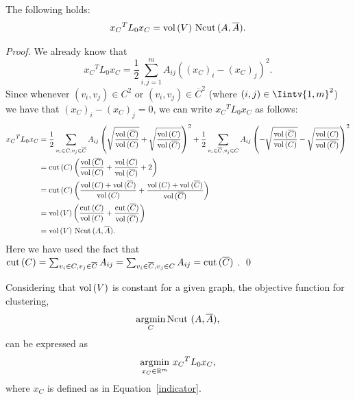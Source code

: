 \begin{theorem}\label{xtxcut}
   The following holds:
   \begin{equation}
      {x_C}^TL_0{x_C} = \operatorname*{vol\,}(V)\, \operatorname*{Ncut\,} (A, \overline A).
   \end{equation}
\end{theorem}
\begin{proof}
   We already know that
   \begin{equation*}
         {x_C}^TL_0{x_C} = \frac{1}{2} \sum_{i,j=1}^m A_{ij} ((x_C)_i - (x_C)_j) ^2 .
   \end{equation*}
   Since whenever $(v_i, v_j) \in C^2$ or $(v_i, v_j) \in {\overline C}^2$ (where $(i,j) \in \Iintv{1,m}^2$) we have that $(x_C)_i - (x_C)_j = 0$, we can write ${x_C}^TL_0{x_C}$ as follows:
   \begin{equation*}
      \begin{split}
         {x_C}^TL_0{x_C} &=  \frac{1}{2} \sum_{v_i \in C, v_j \in \overline C}A_{ij} \left( \sqrt{\frac{\operatorname*{vol\,} (\overline C)}{\operatorname*{vol\,} (C)}} + \sqrt{\frac{\operatorname*{vol\,} (C)}{\operatorname*{vol\,} (\overline C)}} \right)^2 + \frac{1}{2} \sum_{v_i \in \overline C, v_j \in C} A_{ij} \left( -\sqrt{\frac{\operatorname*{vol\,} (\overline C)}{\operatorname*{vol\,} (C)}}  -\sqrt{\frac{\operatorname*{vol\,} (C)}{\operatorname*{vol\,} (\overline C)}} \right)^2 \\
         &= \operatorname{cut\,} (C) \left( \frac{\operatorname*{vol\,} (\overline C)}{\operatorname*{vol\,} (C)} + \frac{\operatorname*{vol\,} (C)}{\operatorname*{vol\,} (\overline C)} + 2 \right) \\
         &= \operatorname{cut\,} (C) \left( \frac{\operatorname*{vol\,} (C) + \operatorname*{vol\,} (\overline C)}{\operatorname*{vol\,} (C)} + \frac{\operatorname*{vol\,} (C) + \operatorname*{vol\,} (\overline C)}{\operatorname*{vol\,} (\overline C)} \right) \\
         &= \operatorname*{vol\,} (V) \left( \frac{\operatorname{cut\,}(C)}{\operatorname*{vol\,} (C)} + \frac{\operatorname{cut\,}(\overline C)}{\operatorname*{vol\,} (\overline C)} \right) \\
         &= \operatorname*{vol\,} (V)\, \operatorname*{Ncut\,}(A, \overline A).
      \end{split}
   \end{equation*}
   Here we have used the fact that $\operatorname{cut\,}(C) = \sum_{v_i \in C, v_j \in \overline C} A_{ij} =\sum_{v_i \in \overline C, v_j \in C} A_{ij} = \operatorname{cut\,}(\overline C)$ . \qed
\end{proof}

Considering that $\operatorname*{vol\,} (V)$ is constant for a given graph, the objective function for clustering,
\begin{equation}
   \operatorname*{\arg\!\min}_C \operatorname*{Ncut\,}\,(A, \overline A),
\end{equation}
can be expressed as
\begin{equation}\label{npequation}
   \operatorname*{\arg\!\min}_{x_C \in \mathbb R^{m }} \,{x_C}^T L_0 x_C \text{,}
\end{equation}
where $x_C$ is defined as in Equation~\vref{indicator}.

